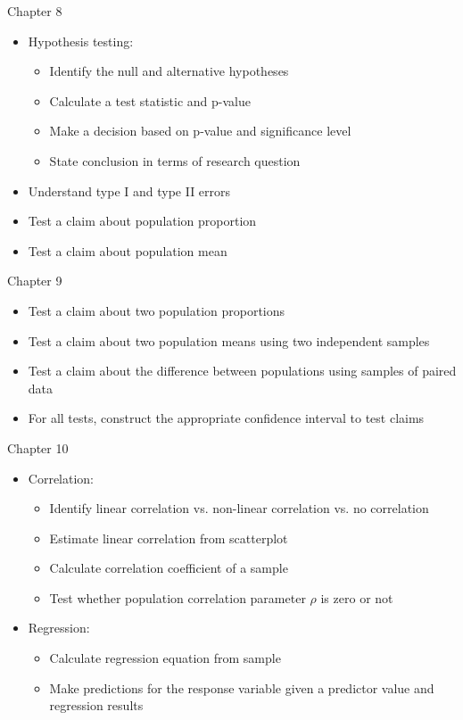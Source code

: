 \documentclass[xcolor=table]{beamer}
\begin{document}
\begin{frame}{Chapter 8}
\begin{block}{}
\large
\begin{itemize}
\item Hypothesis testing:
\begin{itemize}
\item Identify the null and alternative hypotheses
\item Calculate a test statistic and p-value
\item Make a decision based on p-value and significance level
\item State conclusion in terms of research question
\end{itemize}
\item Understand type I and type II errors
\item Test a claim about population proportion
\item Test a claim about population mean
\end{itemize}
\end{block}
\end{frame}

\begin{frame}{Chapter 9}
\begin{block}{}
\large
\begin{itemize}
\item Test a claim about two population proportions
\item Test a claim about two population means using two independent samples
\item Test a claim about the difference between populations using samples of paired data
\item For all tests, construct the appropriate confidence interval to test claims
\end{itemize}
\end{block}
\end{frame}

\begin{frame}{Chapter 10}
\begin{block}{}
\large
\begin{itemize}
\item Correlation:
\begin{itemize}
\item Identify linear correlation vs. non-linear correlation vs. no correlation
\item Estimate linear correlation from scatterplot
\item Calculate correlation coefficient of a sample
\item Test whether population correlation parameter $\rho$ is zero or not
\end{itemize}
\item Regression:
\begin{itemize}
\item Calculate regression equation from sample
\item Make predictions for the response variable given a predictor value and regression results
\end{itemize}
\end{itemize}
\end{block}
\end{frame}
\end{document}
